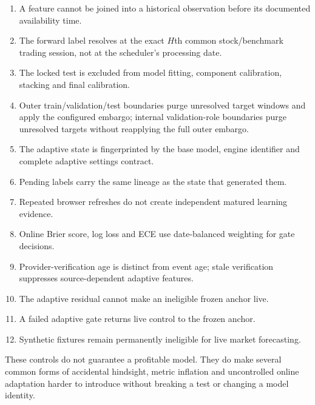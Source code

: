 \documentclass[11pt]{article}
\begin{document}
\begin{enumerate}
\item A feature cannot be joined into a historical observation before its documented availability time.
\item The forward label resolves at the exact $H$th common stock/benchmark trading session, not at the scheduler's processing date.
\item The locked test is excluded from model fitting, component calibration, stacking and final calibration.
\item Outer train/validation/test boundaries purge unresolved target windows and apply the configured embargo; internal validation-role boundaries purge unresolved targets without reapplying the full outer embargo.
\item The adaptive state is fingerprinted by the base model, engine identifier and complete adaptive settings contract.
\item Pending labels carry the same lineage as the state that generated them.
\item Repeated browser refreshes do not create independent matured learning evidence.
\item Online Brier score, log loss and ECE use date-balanced weighting for gate decisions.
\item Provider-verification age is distinct from event age; stale verification suppresses source-dependent adaptive features.
\item The adaptive residual cannot make an ineligible frozen anchor live.
\item A failed adaptive gate returns live control to the frozen anchor.
\item Synthetic fixtures remain permanently ineligible for live market forecasting.
\end{enumerate}

These controls do not guarantee a profitable model. They do make several common forms of accidental hindsight, metric inflation and uncontrolled online adaptation harder to introduce without breaking a test or changing a model identity.

\begingroup
\footnotesize
\end{document}
